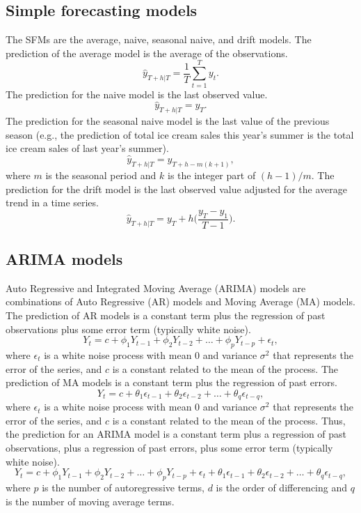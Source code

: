 \subsection{Simple forecasting models}

The SFMs are the average, naive, seasonal naive, and drift models. The prediction of the average model is the average of the observations. \[\hat{y}_{T+h|T} = \frac{1}{T} \sum_{t=1}^{T} y_{t}.\] The prediction for the naive model is the last observed value. \[\hat{y}_{T+h|T} = y_{T}.\] The prediction for the seasonal naive model is the last value of the previous season (e.g., the prediction of total ice cream sales this year's summer is the total ice cream sales of last year's summer).  \[\hat{y}_{T+h|T} = y_{T+h-m(k+1)},\] where \(m\) is the seasonal period and \(k\) is the integer part of \((h-1)/m\). The prediction for the drift model is the last observed value adjusted for the average trend in a time series.  \[\hat{y}_{T+h|T} = y_{T} + h \Big(\frac{y_{T} - y_{1}}{T-1} \Big).\]

\subsection{ARIMA models}

Auto Regressive and Integrated Moving Average (ARIMA) models are combinations of Auto Regressive (AR) models and Moving Average (MA) models. The prediction of AR models is a constant term plus the regression of past observations plus some error term (typically white noise). \[Y_{t} = c + \phi_{1}Y_{t-1} + \phi_{2}Y_{t-2} + \ldots + \phi_{p}Y_{t-p} + \epsilon_{t},\] where \(\epsilon_{t}\) is a white noise process with mean 0 and variance \(\sigma^2\) that represents the error of the series, and \(c\) is a constant related to the mean of the process. The prediction of MA models is a constant term plus the regression of past errors. \[Y_{t} = c + \theta_{1} \epsilon_{t-1} +  \theta_{2} \epsilon_{t-2} + \ldots +  \theta_{q} \epsilon_{t-q},\] where \(\epsilon_{t}\) is a white noise process with mean 0 and variance \(\sigma^2\) that represents the error of the series, and \(c\) is a constant related to the mean of the process. Thus, the prediction for an ARIMA model is a constant term plus a regression of past observations, plus a regression of past errors, plus some error term (typically white noise). \[Y_{t} = c + \phi_{1}Y_{t-1} + \phi_{2}Y_{t-2} + \ldots + \phi_{p}Y_{t-p} + \epsilon_{t} + \theta_{1} \epsilon_{t-1} +  \theta_{2} \epsilon_{t-2} + \ldots +  \theta_{q} \epsilon_{t-q},\] where \(p\) is the number of autoregressive terms, \(d\) is the order of differencing and \(q\) is the number of moving average terms.

